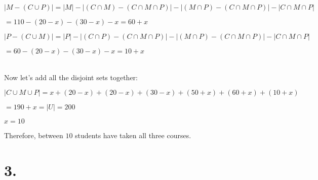 \documentclass{article}
\newenvironment{Solution}
{\noindent\color{red}}
{\newline}
\begin{document}
\begin{Solution}
\begin{adjustwidth}{2em}{0em}
\begin{adjustwidth}{2em}{0em}
            $|M - (C \cup P)| = |M| - |(C \cap M) - (C \cap M \cap P)| - |(M \cap P)- (C \cap M \cap P)| - |C \cap M \cap P|$

            \hspace*{6.585em}$ = 110 - (20 - x) - (30 - x) - x = 60 + x$

            $|P - (C \cup M)| = |P| - |(C \cap P) - (C \cap M \cap P)| - |(M \cap P)- (C \cap M \cap P)| - |C \cap M \cap P|$

            \hspace*{6.585em}$ = 60 - (20 - x) - (30 - x) - x = 10 + x$
        \end{adjustwidth}
    \end{adjustwidth}

    \ \\

    Now let's add all the disjoint sets together:

    $|C \cup M \cup P| = x + (20 - x) + (20 - x) + (30 - x) + (50 + x) + (60 + x) + (10 + x)$

    \phantom{ }

    \hspace*{5.71em}$= 190 + x = |U| = 200$
    
    \hspace*{5.71em}$x = 10$

    \phantom{ }

    Therefore, between $10$ students have taken all three courses. 
\end{Solution}







\vspace*{5em}




\section*{3. }
\end{document}
